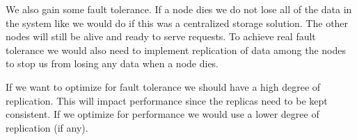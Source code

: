 \documentclass[a4paper, 11pt]{article}
\begin{document}
We also gain some fault tolerance. If a node dies we do not lose all of the data in the system like we would do if this was a centralized storage solution. The other nodes will still be alive and ready to serve requests. To achieve real fault tolerance we would also need to implement replication of data among the nodes to stop us from losing any data when a node dies.

If we want to optimize for fault tolerance we should have a high degree of replication. This will impact performance since the replicas need to be kept consistent. If we optimize for performance we would use a lower degree of replication (if any).
\end{document}
